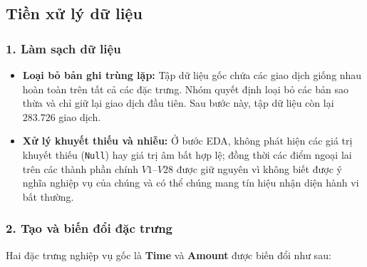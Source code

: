 

\subsection{Tiền xử lý dữ liệu}\label{subsec:preprocessing}
\subsubsection*{1. Làm sạch dữ liệu}
\begin{itemize}
    \item \textbf{Loại bỏ bản ghi trùng lặp:} Tập dữ liệu gốc chứa các giao dịch giống nhau hoàn toàn trên tất cả các đặc trưng. Nhóm quyết định loại bỏ các bản sao thừa và chỉ giữ lại giao dịch đầu tiên. Sau bước này, tập dữ liệu còn lại $283.726$ giao dịch.
    \item \textbf{Xử lý khuyết thiếu và nhiễu:} Ở bước EDA, không phát hiện các giá trị khuyết thiếu (\texttt{Null}) hay giá trị âm bất hợp lệ; đồng thời các điểm ngoại lai trên các thành phần chính $V1$--$V28$ được giữ nguyên vì không biết được ý nghĩa nghiệp vụ của chúng và có thể chúng mang tín hiệu nhận diện hành vi bất thường.
\end{itemize}

\subsubsection*{2. Tạo và biến đổi đặc trưng}
Hai đặc trưng nghiệp vụ gốc là \textbf{Time} và \textbf{Amount} được biến đổi như sau:

